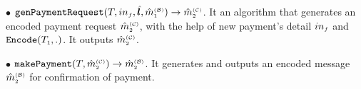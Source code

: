 \begin{definition}
%
\item  [$\bullet$] $\mathtt{genPaymentRequest}(T, in_{\scriptscriptstyle f}, \hat{\bm{l}}, \hat m^{\scriptscriptstyle\mathcal{(B)}}_{\scriptscriptstyle1})\rightarrow \hat m^{\scriptscriptstyle\mathcal{(C)}}_{\scriptscriptstyle2}$. It an algorithm that generates an encoded payment request  $\hat m^{\scriptscriptstyle\mathcal{(C)}}_{\scriptscriptstyle2}$, with the help of new payment's detail $in_{\scriptscriptstyle f}$ and $\mathtt{Encode}(T_{\scriptscriptstyle 1},.)$. It outputs  $\hat m^{\scriptscriptstyle\mathcal{(C)}}_{\scriptscriptstyle2}$.  
%
\item  [$\bullet$] $\mathtt{makePayment}(T, \hat m^{\scriptscriptstyle\mathcal{(C)}}_{\scriptscriptstyle2})\rightarrow \hat m^{\scriptscriptstyle\mathcal{(B)}}_{\scriptscriptstyle2}$. It  generates and outputs an encoded message $\hat m^{\scriptscriptstyle\mathcal{(B)}}_{\scriptscriptstyle2}$ for confirmation of payment. 
%


 

\end{definition}
